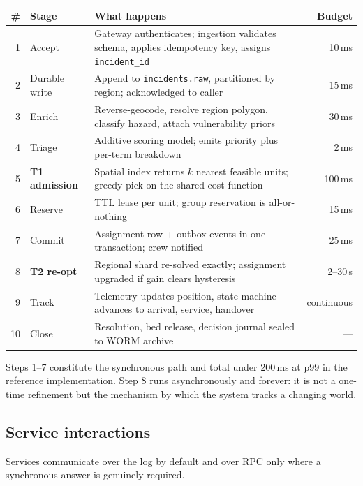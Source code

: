 \documentclass[11pt,a4paper]{article}
\begin{document}
\begin{center}
\footnotesize
\begin{tabular}{@{}rp{52mm}p{58mm}r@{}}
\toprule
\textbf{\#} & \textbf{Stage} & \textbf{What happens} & \textbf{Budget} \\
\midrule
1 & Accept & Gateway authenticates; ingestion validates schema, applies idempotency key, assigns \texttt{incident\_id} & 10\,ms \\
2 & Durable write & Append to \texttt{incidents.raw}, partitioned by region; acknowledged to caller & 15\,ms \\
3 & Enrich & Reverse-geocode, resolve region polygon, classify hazard, attach vulnerability priors & 30\,ms \\
4 & Triage & Additive scoring model; emits priority plus per-term breakdown & 2\,ms \\
5 & \textbf{T1 admission} & Spatial index returns $k$ nearest feasible units; greedy pick on the shared cost function & 100\,ms \\
6 & Reserve & TTL lease per unit; group reservation is all-or-nothing & 15\,ms \\
7 & Commit & Assignment row + outbox events in one transaction; crew notified & 25\,ms \\
8 & \textbf{T2 re-opt} & Regional shard re-solved exactly; assignment upgraded if gain clears hysteresis & 2--30\,s \\
9 & Track & Telemetry updates position, state machine advances to arrival, service, handover & continuous \\
10 & Close & Resolution, bed release, decision journal sealed to WORM archive & --- \\
\bottomrule
\end{tabular}
\end{center}

\noindent Steps 1--7 constitute the synchronous path and total under 200\,ms at
p99 in the reference implementation. Step 8 runs asynchronously and forever:
it is not a one-time refinement but the mechanism by which the system tracks a
changing world.

\subsection{Service interactions}

Services communicate over the log by default and over RPC only where a
synchronous answer is genuinely required.
\end{document}
